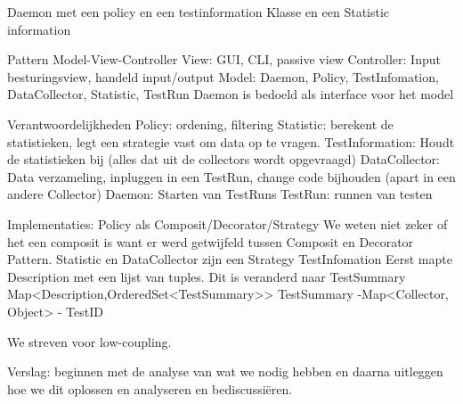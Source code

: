 \documentclass[i2]{oss}
\begin{document}
Daemon met een policy en een testinformation Klasse en een Statistic information 

Pattern Model-View-Controller
View:  GUI, CLI, passive view
Controller:
Input besturingsview, handeld input/output
Model: Daemon, Policy, TestInfomation, DataCollector, Statistic, TestRun
Daemon is bedoeld als interface voor het model

Verantwoordelijkheden
Policy: ordening, filtering
Statistic: berekent de statistieken, legt een strategie vast om data op te vragen.
TestInformation:  Houdt de statistieken bij (alles dat uit de collectors wordt opgevraagd)
DataCollector: Data verzameling, inpluggen in een TestRun, change code bijhouden (apart in een andere Collector)
Daemon:  Starten van TestRuns
TestRun:  runnen van testen

Implementaties:
Policy als Composit/Decorator/Strategy
We weten niet zeker of het een composit is want er werd getwijfeld tussen Composit en Decorator Pattern. 
Statistic en DataCollector zijn een Strategy
TestInfomation
Eerst mapte Description met een lijst van tuples. Dit is veranderd naar TestSummary
Map<Description,OrderedSet<TestSummary>>
	TestSummary	-Map<Collector, Object>
			- TestID


We streven voor low-coupling. 

Verslag: beginnen met de analyse van wat we nodig hebben en daarna uitleggen hoe we dit oplossen en analyseren en bediscussiëren.

 
\end{document}

